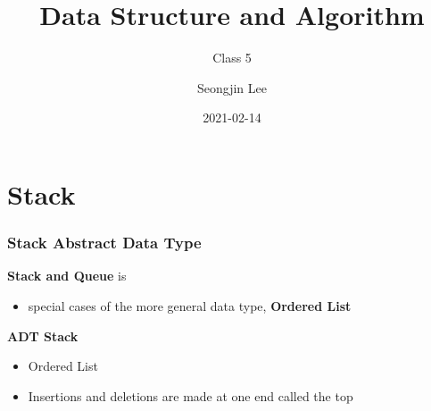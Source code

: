 \documentclass[newPxFont,sthlmFooter,nooffset]{beamer}
\title{Data Structure and Algorithm}
\subtitle{Class 5}
\author[SJL]{Seongjin Lee}
\institute{\href{mailto:insight@gnu.ac.kr}{insight@gnu.ac.kr}\\\url{http://resourceful.github.io}\\Systems Research Lab.\\GNU}
\date{2021-02-14}
\begin{document}
\frame[plain,t]{\titlepage} 



\section{Stack} 
\begin{frame}[t]
  \frametitle{Stack Abstract Data Type}
\textbf{Stack and Queue} is
\begin{itemize}
\item special cases of the more general data type, \textbf{Ordered List}
\end{itemize}

\textbf{ADT Stack}
\begin{itemize}
\item Ordered List
\item Insertions and deletions are made at one end called the top
\end{itemize}
\end{frame}
\end{document}
